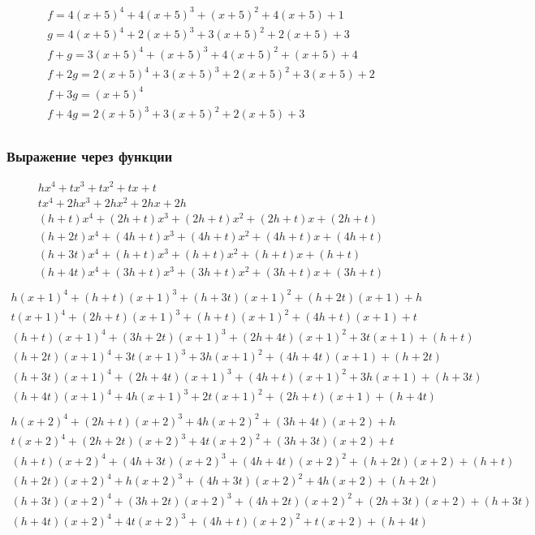 \documentclass[bibliography=totoc, a4paper, 12pt]{extarticle}
\begin{document}
$$\begin{array}{l}
f = 4(x+5)^4 + 4(x+5)^3 + (x+5)^2 + 4(x+5) + 1\\
g = 4(x+5)^4 + 2(x+5)^3 + 3(x+5)^2 + 2(x+5) + 3\\
f + g = 3(x+5)^4 + (x+5)^3 + 4(x+5)^2 + (x+5) + 4\\
f + 2g = 2(x+5)^4 + 3(x+5)^3 + 2(x+5)^2 + 3(x+5) + 2\\
f + 3g = (x+5)^4\\
f + 4g = 2(x+5)^3 + 3(x+5)^2 + 2(x+5) + 3\\
\end{array}$$
\subsubsection{Выражение через функции}
$$\begin{array}{l}
hx^4 + tx^3 + tx^2 + tx + t\\
tx^4 + 2hx^3 + 2hx^2 + 2hx + 2h\\
(h + t)x^4 + (2h + t)x^3 + (2h + t)x^2 + (2h + t)x + (2h + t)\\
(h + 2t)x^4 + (4h + t)x^3 + (4h + t)x^2 + (4h + t)x + (4h + t)\\
(h + 3t)x^4 + (h + t)x^3 + (h + t)x^2 + (h + t)x + (h + t)\\
(h + 4t)x^4 + (3h + t)x^3 + (3h + t)x^2 + (3h + t)x + (3h + t)\\
\end{array}$$
$$\begin{array}{l}
h(x+1)^4 + (h + t)(x+1)^3 + (h + 3t)(x+1)^2 + (h + 2t)(x+1) + h\\
t(x+1)^4 + (2h + t)(x+1)^3 + (h + t)(x+1)^2 + (4h + t)(x+1) + t\\
(h + t)(x+1)^4 + (3h + 2t)(x+1)^3 + (2h + 4t)(x+1)^2 + 3t(x+1) + (h + t)\\
(h + 2t)(x+1)^4 + 3t(x+1)^3 + 3h(x+1)^2 + (4h + 4t)(x+1) + (h + 2t)\\
(h + 3t)(x+1)^4 + (2h + 4t)(x+1)^3 + (4h + t)(x+1)^2 + 3h(x+1) + (h + 3t)\\
(h + 4t)(x+1)^4 + 4h(x+1)^3 + 2t(x+1)^2 + (2h + t)(x+1) + (h + 4t)\\
\end{array}$$
$$\begin{array}{l}
h(x+2)^4 + (2h + t)(x+2)^3 + 4h(x+2)^2 + (3h + 4t)(x+2) + h\\
t(x+2)^4 + (2h + 2t)(x+2)^3 + 4t(x+2)^2 + (3h + 3t)(x+2) + t\\
(h + t)(x+2)^4 + (4h + 3t)(x+2)^3 + (4h + 4t)(x+2)^2 + (h + 2t)(x+2) + (h + t)\\
(h + 2t)(x+2)^4 + h(x+2)^3 + (4h + 3t)(x+2)^2 + 4h(x+2) + (h + 2t)\\
(h + 3t)(x+2)^4 + (3h + 2t)(x+2)^3 + (4h + 2t)(x+2)^2 + (2h + 3t)(x+2) +
(h + 3t)\\
(h + 4t)(x+2)^4 + 4t(x+2)^3 + (4h + t)(x+2)^2 + t(x+2) + (h + 4t)\\
\end{array}$$
\end{document}
